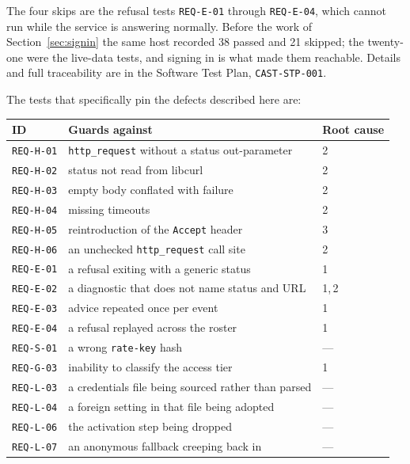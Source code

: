 \documentclass[11pt]{article}
\newcommand{\code}[1]{\texttt{#1}}
\newcommand{\req}[1]{\texttt{#1}}
\begin{document}
\noindent The four skips are the refusal tests \req{REQ-E-01} through
\req{REQ-E-04}, which cannot run while the service is answering
normally.  Before the work of Section~\ref{sec:signin} the same host
recorded 38 passed and 21 skipped; the twenty-one were the live-data
tests, and signing in is what made them reachable.  Details and full
traceability are in the Software Test Plan, \code{CAST-STP-001}.

The tests that specifically pin the defects described here are:

\begin{center}
\begin{tabular}{lll}
\toprule
\textbf{ID} & \textbf{Guards against} & \textbf{Root cause} \\
\midrule
\req{REQ-H-01} & \code{http\_request} without a status out-parameter & 2 \\
\req{REQ-H-02} & status not read from libcurl                        & 2 \\
\req{REQ-H-03} & empty body conflated with failure                   & 2 \\
\req{REQ-H-04} & missing timeouts                                    & 2 \\
\req{REQ-H-05} & reintroduction of the \code{Accept} header          & 3 \\
\req{REQ-H-06} & an unchecked \code{http\_request} call site         & 2 \\
\req{REQ-E-01} & a refusal exiting with a generic status             & 1 \\
\req{REQ-E-02} & a diagnostic that does not name status and URL      & 1,\,2 \\
\req{REQ-E-03} & advice repeated once per event                      & 1 \\
\req{REQ-E-04} & a refusal replayed across the roster                & 1 \\
\req{REQ-S-01} & a wrong \code{rate-key} hash                        & --- \\
\req{REQ-G-03} & inability to classify the access tier               & 1 \\
\midrule
\req{REQ-L-03} & a credentials file being sourced rather than parsed  & --- \\
\req{REQ-L-04} & a foreign setting in that file being adopted         & --- \\
\req{REQ-L-06} & the activation step being dropped                    & --- \\
\req{REQ-L-07} & an anonymous fallback creeping back in               & --- \\

\end{tabular}
\end{center}
\end{document}
